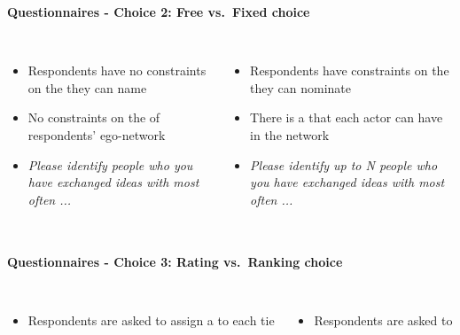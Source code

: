 \documentclass[8pt]{beamer}
\begin{document}
\begin{frame}
\frametitle{\insertsection}
\framesubtitle{Questionnaires - Choice 2: Free vs.\ Fixed choice}

\begin{columns}[t]

{\color{blue}{Free choice}}
\begin{itemize}
\item Respondents have no constraints on the {\color{blue}{number of actors}} they can name
\item No constraints on the {\color{blue}{maximum number of ties}} of respondents' ego-network
\item \textit{Please identify people who you have exchanged ideas with most often ...}
\end{itemize} 


{\color{blue}{Fixed choice}}
\begin{itemize}
\item Respondents have constraints on the {\color{blue}{number of actors}} they can nominate
\item There is a {\color{blue}{maximum number of ties}} that each actor can have in the network
\item \textit{Please identify up to N people who you have exchanged ideas with most often ...}
\end{itemize} 

\end{columns}

\end{frame}


\begin{frame}
\frametitle{\insertsection}
\framesubtitle{Questionnaires - Choice 3: Rating vs.\ Ranking choice}

\begin{columns}[t]

{\color{blue}{Rating}}
\begin{itemize}
\item Respondents are asked to assign a {\color{blue}{value}} to each tie
\end{itemize} 


{\color{blue}{Complete ranking}}
\begin{itemize}
\item Respondents are asked to {\color{blue}{rank all their ties}}
\end{itemize} 

\end{columns}

\end{frame}
\end{document}
